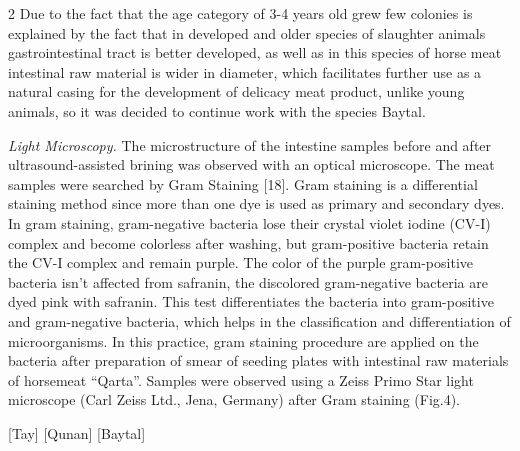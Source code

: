 \begin{multicols}{2}
Due to the fact that the age category of 3-4 years old grew few colonies
is explained by the fact that in developed and older species of
slaughter animals gastrointestinal tract is better developed, as well as
in this species of horse meat intestinal raw material is wider in
diameter, which facilitates further use as a natural casing for the
development of delicacy meat product, unlike young animals, so it was
decided to continue work with the species Baytal.

\emph{Light Microscopy.} The microstructure of the intestine samples
before and after ultrasound-assisted brining was observed with an
optical microscope. The meat samples were searched by Gram Staining
{[}18{]}. Gram staining is a differential staining method since more
than one dye is used as primary and secondary dyes. In gram staining,
gram-negative bacteria lose their crystal violet iodine (CV-I) complex
and become colorless after washing, but gram-positive bacteria retain
the CV-I complex and remain purple. The color of the purple
gram-positive bacteria isn't affected from safranin, the discolored
gram-negative bacteria are dyed pink with safranin. This test
differentiates the bacteria into gram-positive and gram-negative
bacteria, which helps in the classification and differentiation of
microorganisms. In this practice, gram staining procedure are applied on
the bacteria after preparation of smear of seeding plates with
intestinal raw materials of horsemeat ``Qarta''. Samples were observed
using a Zeiss Primo Star light microscope (Carl Zeiss Ltd., Jena,
Germany) after Gram staining (Fig.4).
\end{multicols}

\begin{figs}
[Tay]
[Qunan]
[Baytal]
\end{figs}

